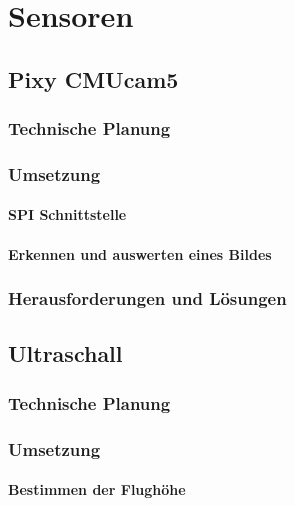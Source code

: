 \chapter{Sensoren}
\renewcommand{\kapitelautor}{Autor: Lucas Ullrich}

\section{Pixy CMUcam5}

  \subsection{Technische Planung}

  \subsection{Umsetzung}

    \subsubsection{SPI Schnittstelle}

    \subsubsection{Erkennen und auswerten eines Bildes}

  \subsection{Herausforderungen und Lösungen}

\section{Ultraschall}

  \subsection{Technische Planung}

  \subsection{Umsetzung}

    \subsubsection{Bestimmen der Flughöhe}

